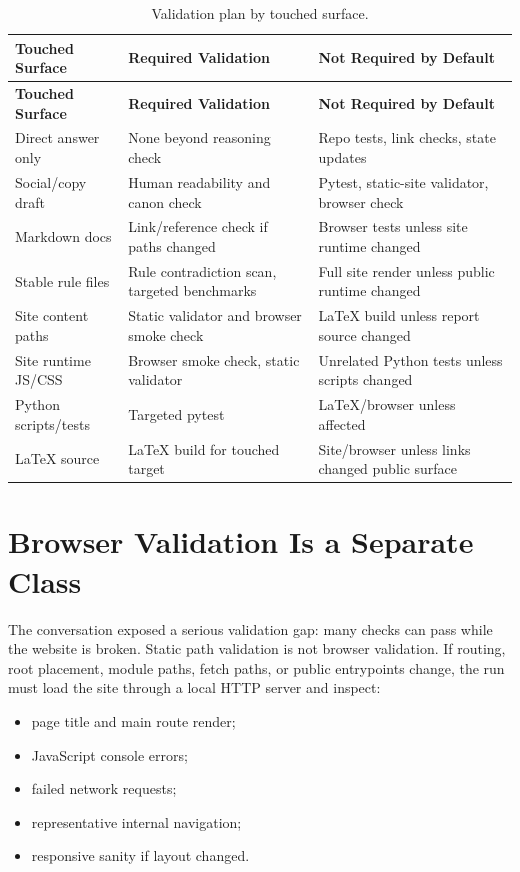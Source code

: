 \documentclass[a4paper,11pt,openany]{report}
\begin{document}
\begin{longtable}{p{} p{} p{}}
\caption{Validation plan by touched surface.}
\label{tab:validation-by-mode}\\
\toprule
\textbf{Touched Surface} & \textbf{Required Validation} & \textbf{Not Required by Default} \\
\midrule
\endfirsthead
\toprule
\textbf{Touched Surface} & \textbf{Required Validation} & \textbf{Not Required by Default} \\
\midrule
\endhead
Direct answer only & None beyond reasoning check & Repo tests, link checks, state updates \\
Social/copy draft & Human readability and canon check & Pytest, static-site validator, browser check \\
Markdown docs & Link/reference check if paths changed & Browser tests unless site runtime changed \\
Stable rule files & Rule contradiction scan, targeted benchmarks & Full site render unless public runtime changed \\
Site content paths & Static validator and browser smoke check & LaTeX build unless report source changed \\
Site runtime JS/CSS & Browser smoke check, static validator & Unrelated Python tests unless scripts changed \\
Python scripts/tests & Targeted pytest & LaTeX/browser unless affected \\
LaTeX source & LaTeX build for touched target & Site/browser unless links changed public surface \\
\bottomrule
\end{longtable}

\section{Browser Validation Is a Separate Class}

The conversation exposed a serious validation gap: many checks can pass while
the website is broken. Static path validation is not browser validation. If
routing, root placement, module paths, fetch paths, or public entrypoints change,
the run must load the site through a local HTTP server and inspect:

\begin{itemize}
  \item page title and main route render;
  \item JavaScript console errors;
  \item failed network requests;
  \item representative internal navigation;
  \item responsive sanity if layout changed.
\end{itemize}
\end{document}
